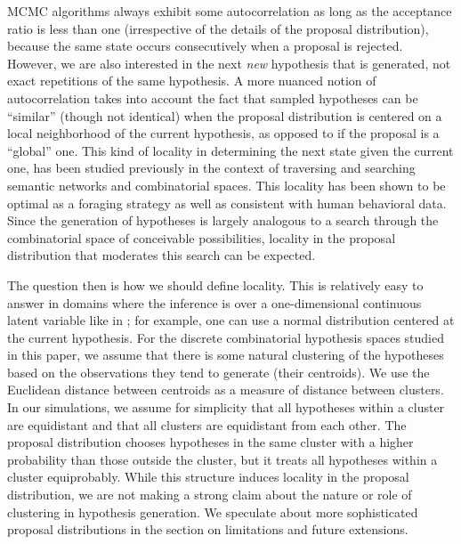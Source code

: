 MCMC algorithms always exhibit some autocorrelation 
as long as the acceptance ratio is less than one (irrespective of the details of the proposal distribution), because the same state occurs consecutively when a proposal is rejected.
However, we are also interested in the next \textit{new} hypothesis that is generated, not exact repetitions of the same hypothesis. A more nuanced notion of autocorrelation takes into account the fact that sampled hypotheses can be ``similar'' (though not identical) when the proposal distribution is centered on a local neighborhood of the current hypothesis, as opposed to if the proposal is a ``global'' one. This kind of locality in determining the next state given the current one, has been studied previously in the context of traversing and searching semantic networks \citep{abbott2015random} and combinatorial spaces.\citep{smith2013multiply} This locality has been shown to be optimal as a foraging strategy \citep{hills2012optimal} as well as consistent with human behavioral data. Since the generation of hypotheses is largely analogous to a search through the combinatorial space of conceivable possibilities, locality in the proposal distribution that moderates this search can be expected.

The question then is how we should define locality. This is relatively easy to answer in domains where the inference is over a one-dimensional continuous latent variable like in \citet{Lieder2013}; for example, one can use a normal distribution centered at the current hypothesis. For the discrete combinatorial hypothesis spaces studied in this paper, we assume that there is some natural clustering of the hypotheses based on the observations they tend to generate (their centroids). We use the Euclidean distance between centroids as a measure of distance between clusters. In our simulations, we assume for simplicity that all hypotheses within a cluster are equidistant and that all clusters are equidistant from each other. The proposal distribution chooses hypotheses in the same cluster with a higher probability than those outside the cluster, but it treats all hypotheses within a cluster equiprobably. While this structure induces locality in the proposal distribution, we are not making a strong claim about the nature or role of clustering in hypothesis generation. We speculate about more sophisticated proposal distributions in the section on limitations and future extensions. 


